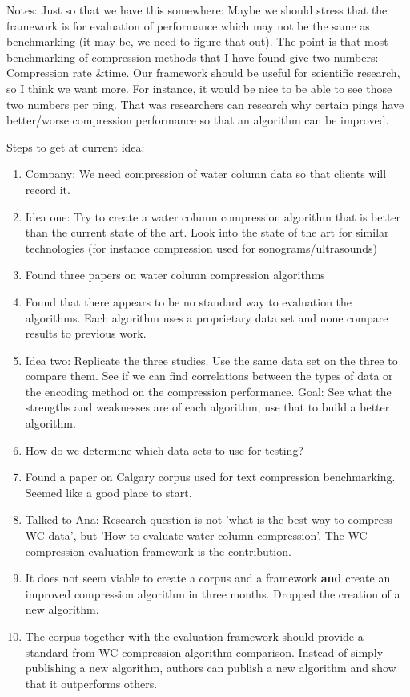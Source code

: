 \clearpage
Notes:
Just so that we have this somewhere: Maybe we should stress that the framework is for evaluation of performance which may not be the same as benchmarking (it may be, we need to figure that out). The point is that most benchmarking of compression methods that I have found give two numbers: Compression rate \&time. Our framework should be useful for scientific research, so I think we want more. For instance, it would be nice to be able to see those two numbers per ping. That was researchers can research why certain pings have better/worse compression performance so that an algorithm can be improved.


Steps to get at current idea:
\begin{enumerate}
\item Company: We need compression of water column data so that clients will record it.
\item Idea one: Try to create a water column compression algorithm that is better than the current state of the art. Look into the state of the art for similar technologies (for instance compression used for sonograms/ultrasounds)
\item Found three papers on water column compression algorithms
\item Found that there appears to be no standard way to evaluation the algorithms. Each algorithm uses a proprietary data set and none compare results to previous work.
\item Idea two: Replicate the three studies. Use the same data set on the three to compare them. See if we can find correlations between the types of data or the encoding method on the compression performance. Goal: See what the strengths and weaknesses are of each algorithm, use that to build a better algorithm.
\item How do we determine which data sets to use for testing?
\item Found a paper on Calgary corpus used for text compression benchmarking. Seemed like a good place to start.
\item Talked to Ana: Research question is not 'what is the best way to compress WC data', but 'How to evaluate water column compression'.  The WC compression evaluation framework is the contribution.
\item It does not seem viable to create a corpus and a framework \textbf{and} create an improved compression algorithm in three months. Dropped the creation of a new algorithm. 
\item The corpus together with the evaluation framework should provide a standard from WC compression algorithm comparison. Instead of simply publishing a new algorithm, authors can publish a new algorithm and show that it outperforms others. 
\end{enumerate}